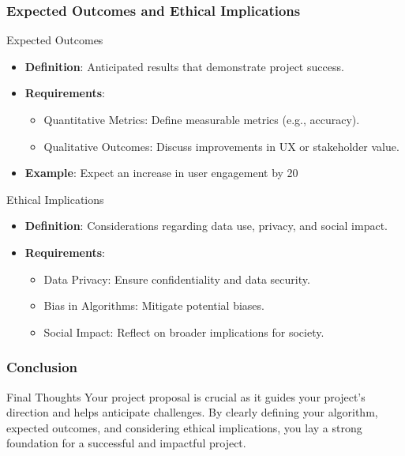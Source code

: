 \documentclass[aspectratio=169]{beamer}
\begin{document}
\begin{frame}[fragile]
    \frametitle{Expected Outcomes and Ethical Implications}
    
    \begin{block}{Expected Outcomes}
        \begin{itemize}
            \item \textbf{Definition}: Anticipated results that demonstrate project success.
            \item \textbf{Requirements}:
            \begin{itemize}
                \item Quantitative Metrics: Define measurable metrics (e.g., accuracy).
                \item Qualitative Outcomes: Discuss improvements in UX or stakeholder value.
            \end{itemize}
            \item \textbf{Example}: Expect an increase in user engagement by 20%
        \end{itemize}
    \end{block}
    
    \begin{block}{Ethical Implications}
        \begin{itemize}
            \item \textbf{Definition}: Considerations regarding data use, privacy, and social impact.
            \item \textbf{Requirements}:
            \begin{itemize}
                \item Data Privacy: Ensure confidentiality and data security.
                \item Bias in Algorithms: Mitigate potential biases.
                \item Social Impact: Reflect on broader implications for society.
            \end{itemize}
        \end{itemize}
    \end{block}
\end{frame}

\begin{frame}[fragile]
    \frametitle{Conclusion}
    \begin{block}{Final Thoughts}
        Your project proposal is crucial as it guides your project's direction and helps anticipate challenges.
        By clearly defining your algorithm, expected outcomes, and considering ethical implications, 
        you lay a strong foundation for a successful and impactful project.
    \end{block}
\end{frame}
\end{document}
